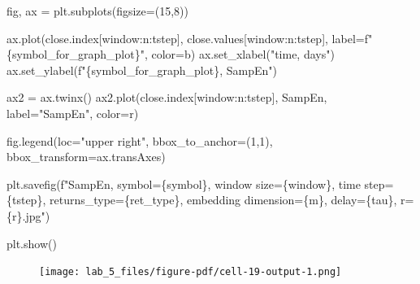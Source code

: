 \documentclass[
  letterpaper,
]{report}
\newenvironment{Shaded}{\begin{snugshade}}{\end{snugshade}}
\newcommand{\DecValTok}[1]{\textcolor[rgb]{0.68,0.00,0.00}{#1}}
\newcommand{\NormalTok}[1]{\textcolor[rgb]{0.00,0.23,0.31}{#1}}
\newcommand{\OperatorTok}[1]{\textcolor[rgb]{0.37,0.37,0.37}{#1}}
\newcommand{\SpecialCharTok}[1]{\textcolor[rgb]{0.37,0.37,0.37}{#1}}
\newcommand{\SpecialStringTok}[1]{\textcolor[rgb]{0.13,0.47,0.30}{#1}}
\newcommand{\StringTok}[1]{\textcolor[rgb]{0.13,0.47,0.30}{#1}}
\begin{document}
\begin{Shaded}
\begin{Highlighting}[]
\NormalTok{fig, ax }\OperatorTok{=}\NormalTok{ plt.subplots(figsize}\OperatorTok{=}\NormalTok{(}\DecValTok{15}\NormalTok{,}\DecValTok{8}\NormalTok{))}

\NormalTok{ax.plot(close.index[window:n:tstep], close.values[window:n:tstep], label}\OperatorTok{=}\SpecialStringTok{f"}\SpecialCharTok{\{}\NormalTok{symbol\_for\_graph\_plot}\SpecialCharTok{\}}\SpecialStringTok{"}\NormalTok{, color}\OperatorTok{=}\StringTok{\textquotesingle{}b\textquotesingle{}}\NormalTok{)}
\NormalTok{ax.set\_xlabel(}\StringTok{"time, days"}\NormalTok{)}
\NormalTok{ax.set\_ylabel(}\SpecialStringTok{f"}\SpecialCharTok{\{}\NormalTok{symbol\_for\_graph\_plot}\SpecialCharTok{\}}\SpecialStringTok{, SampEn"}\NormalTok{)}

\NormalTok{ax2 }\OperatorTok{=}\NormalTok{ ax.twinx()}
\NormalTok{ax2.plot(close.index[window:n:tstep], SampEn, label}\OperatorTok{=}\StringTok{"SampEn"}\NormalTok{, color}\OperatorTok{=}\StringTok{\textquotesingle{}r\textquotesingle{}}\NormalTok{)}

\NormalTok{fig.legend(loc}\OperatorTok{=}\StringTok{"upper right"}\NormalTok{, bbox\_to\_anchor}\OperatorTok{=}\NormalTok{(}\DecValTok{1}\NormalTok{,}\DecValTok{1}\NormalTok{), bbox\_transform}\OperatorTok{=}\NormalTok{ax.transAxes)}

\NormalTok{plt.savefig(}\SpecialStringTok{f"SampEn, symbol=}\SpecialCharTok{\{}\NormalTok{symbol}\SpecialCharTok{\}}\SpecialStringTok{, window size=}\SpecialCharTok{\{}\NormalTok{window}\SpecialCharTok{\}}\SpecialStringTok{, time step=}\SpecialCharTok{\{}\NormalTok{tstep}\SpecialCharTok{\}}\SpecialStringTok{, returns\_type=}\SpecialCharTok{\{}\NormalTok{ret\_type}\SpecialCharTok{\}}\SpecialStringTok{, embedding dimension=}\SpecialCharTok{\{}\NormalTok{m}\SpecialCharTok{\}}\SpecialStringTok{, delay=}\SpecialCharTok{\{}\NormalTok{tau}\SpecialCharTok{\}}\SpecialStringTok{, r=}\SpecialCharTok{\{}\NormalTok{r}\SpecialCharTok{\}}\SpecialStringTok{.jpg"}\NormalTok{)}

\NormalTok{plt.show()}
\end{Highlighting}
\end{Shaded}

\begin{figure}[H]

{\centering \texttt{[image: lab\_5\_files/figure-pdf/cell-19-output-1.png]}

}

\end{figure}
\end{document}
